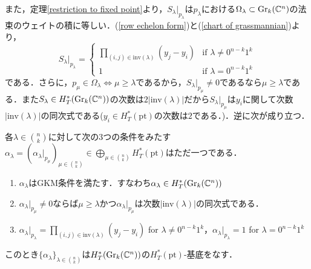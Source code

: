 また，定理\ref{restriction to fixed point}より，$S_\lambda|_{p_\lambda}$は$p_\lambda$における$\Omega_\lambda\subset\text{Gr}_k(\mathbb{C}^n)$の法束のウェイトの積に等しい．(\ref{row echelon form})と(\ref{chart of grassmannian})より，
\begin{equation}\label{restriction of schubert class}
S_\lambda|_{p_\lambda} =\left\{\begin{array}{cc}
  \prod_{(i,j)\in\text{inv}(\lambda)}(y_j-y_i) & \text{if } \lambda\neq 0^{n-k}1^k\\
  1 & \text{if }\lambda = 0^{n-k}1^k
\end{array}\right. 
\end{equation}
である．さらに，$p_\mu\in\Omega_\lambda\Leftrightarrow\mu\geq\lambda$であるから，$S_\lambda|_{p_\mu}\neq0$であるなら$\mu\geq\lambda$である．また$S_\lambda\in H^*_T(\text{Gr}_k(\mathbb{C}^n))$の次数は$2|\text{inv}(\lambda)|$だから$S_\lambda|_{p_\mu}$は$y_i$に関して次数$|\text{inv}(\lambda)|$の同次式である($y_i\in H^*_T(\text{pt})$の次数は$2$である．)．逆に次が成り立つ．

\begin{prop}
  各$\lambda\in\binom{n}{k}$に対して次の3つの条件をみたす$\alpha_\lambda=(\alpha_\lambda|_{p_\mu})_{\mu\in\binom{n}{k}}\in\bigoplus_{\mu\in\binom{n}{k}}H^*_T(\text{pt})$はただ一つである．
  \begin{enumerate}
    \item $\alpha_\lambda$はGKM条件を満たす．すなわち$\alpha_\lambda\in H^*_T(\text{Gr}_k(\mathbb{C}^n))$
    \item $\alpha_\lambda|_{p_\mu}\neq0$ならば$\mu\geq\lambda$かつ$\alpha_\lambda|_{p_\mu}$は次数$|\text{inv}(\lambda)|$の同次式である．
    \item $\alpha_\lambda|_{p_\lambda} = \prod_{(i,j)\in\text{inv}(\lambda)}(y_j-y_i)$ for $\lambda\neq 0^{n-k}1^k$，$\alpha_{\lambda}|_{p_\lambda} = 1$ for $\lambda = 0^{n-k}1^k$
  \end{enumerate}
  このとき$\{\alpha_\lambda\}_{\lambda\in\binom{n}{k}}$は$H^*_T(\text{Gr}_k(\mathbb{C}^n))$の$H^*_T(\text{pt})$-基底をなす．
\end{prop}

